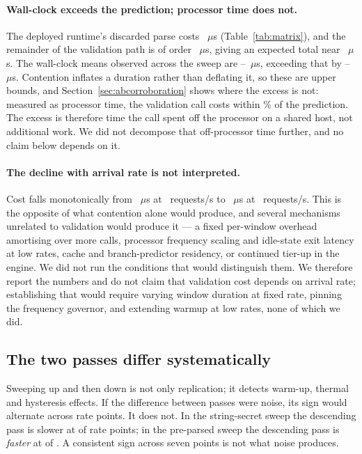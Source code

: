 \documentclass[pdflatex,sn-basic,twocolumn]{sn-jnl}%
\begin{document}
\paragraph{Wall-clock exceeds the prediction; processor time does not.} The
deployed runtime's discarded parse costs \NodeEighteenProbeThrows~$\mu$s
(Table~\ref{tab:matrix}), and the remainder of the validation path is of order
\NodeEighteenJwtPreparsed~$\mu$s, giving an expected total near
\InsituPredictedFromMatrix~$\mu$s. The wall-clock means observed across the
sweep are \InsituObservedLo--\InsituObservedHi~$\mu$s, exceeding that by
\InsituUnaccountedLo--\InsituUnaccountedHi~$\mu$s. Contention inflates a
duration rather than deflating it, so these are upper bounds, and
Section~\ref{sec:abcorroboration} shows where the excess is not: measured as
processor time, the validation call costs within \AbCpuVsPredictedPct\% of the
prediction. The excess is therefore time the call spent off the processor on a
shared host, not additional work. We did not decompose that off-processor time
further, and no claim below depends on it.

\paragraph{The decline with arrival rate is not interpreted.} Cost falls
monotonically from \InsituStringAscA~$\mu$s at \InsituRateA~requests/s to
\InsituStringAscG~$\mu$s at \InsituRateG~requests/s. This is the opposite of what
contention alone would produce, and several mechanisms unrelated to validation
would produce it --- a fixed per-window overhead amortising over more calls,
processor frequency scaling and idle-state exit latency at low rates, cache and
branch-predictor residency, or continued tier-up in the engine. We did not run
the conditions that would distinguish them. We therefore report the numbers and
do not claim that validation cost depends on arrival rate; establishing that
would require varying window duration at fixed rate, pinning the frequency
governor, and extending warmup at low rates, none of which we did.

\subsection{The two passes differ systematically}\label{sec:drift}

Sweeping up and then down is not only replication; it detects warm-up, thermal
and hysteresis effects. If the difference between passes were noise, its sign
would alternate across rate points. It does not. In the string-secret sweep the
descending pass is slower at \InsituStringSameSign{} of \InsituStringPoints{}
rate points; in the pre-parsed sweep the descending pass is \emph{faster} at
\InsituPreparsedSameSign{} of \InsituPreparsedPoints. A consistent sign across
seven points is not what noise produces.
\end{document}
